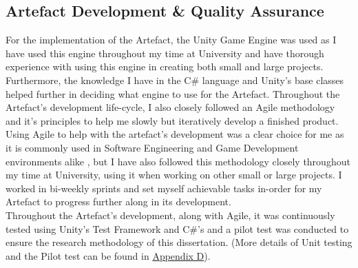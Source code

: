 \subsection{Artefact Development \& Quality Assurance} 
For the implementation of the Artefact, the Unity Game Engine \cite{unity} was used as I have used this engine throughout my time at University and have thorough experience with using this engine in creating both small and large projects. Furthermore, the knowledge I have in the C\# language and Unity's base classes helped further in deciding what engine to use for the Artefact.
Throughout the Artefact's development life-cycle, I also closely followed an Agile methodology and it's principles to help me slowly but iteratively develop a finished product. Using Agile to help with the artefact's development was a clear choice for me as it is commonly used in Software Engineering and Game Development environments alike \cite{game-dev-agile}, but I have also followed this methodology closely throughout my time at University, using it when working on other small or large projects. I worked in bi-weekly sprints and set myself achievable tasks in-order for my Artefact to progress further along in its development.
\\
Throughout the Artefact's development, along with Agile, it was continuously tested using Unity's Test Framework \cite{unit-unit-testing} and C\#'s \cite{nunit-framework} and a pilot test was conducted to ensure the research methodology of this dissertation. (More details of Unit testing and the Pilot test can be found in \hyperref[append:d]{Appendix D}).